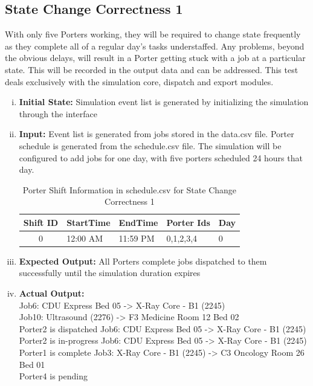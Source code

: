 \documentclass[paper=letter, fontsize=10pt]{scrartcl}
\numberwithin{equation}{section}		%
\numberwithin{figure}{section}			%
\numberwithin{table}{section}				%
\begin{document}
\begin{enumerate}[(i)]
\subsection{State Change Correctness 1}
With only five Porters working, they will be required to change state frequently as they complete all of a regular day's tasks understaffed. Any problems, beyond the obvious delays, will result in a Porter getting stuck with a job at a particular state. This will be recorded in the output data and can be addressed. This test deals exclusively with the simulation core, dispatch and export modules.
\begin{enumerate}[(i)]
	\item \textbf{Initial State:} Simulation event list is generated by initializing the simulation through the interface
	\item \textbf{Input:} Event list is generated from jobs stored in the data.csv file. Porter schedule is generated from the schedule.csv file. The simulation will be configured to add jobs for one day, with five porters scheduled 24 hours that day.
	\begin{table}
	\caption{Porter Shift Information in schedule.csv for State Change Correctness 1}
	\begin{center}
    	\begin{tabular}{| c | l | l | l | l |}
    		\hline
        	Shift ID & StartTime & EndTime & Porter Ids & Day \\ \hline
  			0 & 12:00 AM & 11:59 PM & 0,1,2,3,4 & 0 \\ \hline
    	\end{tabular}
	\end{center}
	\end{table}
	\item \textbf{Expected Output:} All Porters complete jobs dispatched to them successfully until the simulation duration expires
	\item \textbf{Actual Output:}\\
	Job6: CDU Express Bed 05 -> X-Ray Core - B1 (2245)\\
Job10: Ultrasound (2276) -> F3 Medicine Room 12 Bed 02\\
Porter2 is dispatched Job6: CDU Express Bed 05 -> X-Ray Core - B1 (2245)\\
Porter2 is in-progress Job6: CDU Express Bed 05 -> X-Ray Core - B1 (2245)\\
Porter1 is complete Job3: X-Ray Core - B1 (2245) -> C3 Oncology Room 26 Bed 01\\
Porter4 is pending\\

\end{enumerate}
\end{enumerate}
\end{document}
